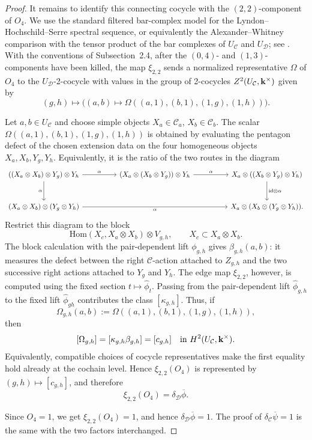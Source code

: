 \documentclass[12pt]{amsart}
\numberwithin{equation}{section}
\theoremstyle{definition}
\newcommand{\id}{\text{id}}
\newcommand{\Hom}{\text{Hom}}
\newcommand{\1}{_{(1)}}
\newcommand{\2}{_{(2)}}
\newcommand{\3}{_{(3)}}
\newcommand{\4}{_{(4)}}
\newcommand{\5}{_{(5)}}
\newcommand{\6}{_{(6)}}
\newcommand{\C}{\mathcal{C}}
\theoremstyle{plain}
\theoremstyle{definition}
\theoremstyle{remark}
\def\C{\mathcal{C}}
\def\D{\mathcal{D}}
\def\Hom{\mathrm{Hom}}
\begin{document}
\begin{proof}
It remains to identify this connecting cocycle with the
$(2,2)$-component of $O_4$. We use the standard filtered bar-complex
model for the Lyndon--Hochschild--Serre spectral sequence, or
equivalently the Alexander--Whitney comparison with the tensor product
of the bar complexes of $U_\C$ and $U_\D$; see
\cite[Chapter VII, Sections 6--7]{Brown}. With the conventions of
Subsection~2.4, after the $(0,4)$- and $(1,3)$-components have been
killed, the map $\xi_{2,2}$ sends a normalized representative $\Omega$
of $O_4$ to the $U_\D$-2-cocycle with values in the group of 2-cocycles $Z^2(U_\C,\bold k^\times)$
given by
\[
        (g,h)\longmapsto
        \big((a,b)\longmapsto
        \Omega((a,1),(b,1),(1,g),(1,h))\big).
\]

Let $a,b\in U_\C$ and choose simple objects
$X_a\in \C_a$, $X_b\in \C_b$. The scalar
$
        \Omega((a,1),(b,1),(1,g),(1,h))
$
is obtained by evaluating the pentagon defect of the chosen extension
data on the four homogeneous objects
$
        X_a, X_b, Y_g, Y_h.
$
Equivalently, it is the ratio of the two routes in the diagram \scriptsize
\[
\begin{tikzcd}[column sep=huge,row sep=large]
((X_a\otimes X_b)\otimes Y_g)\otimes Y_h
\arrow[r,"\alpha"]
\arrow[d,"\alpha"']
&
(X_a\otimes (X_b\otimes Y_g))\otimes Y_h
\arrow[r,"\alpha"]
&
X_a\otimes ((X_b\otimes Y_g)\otimes Y_h)
\arrow[d,"\id\otimes \alpha"]
\\
(X_a\otimes X_b)\otimes (Y_g\otimes Y_h)
\arrow[rr,"\alpha"']
&&
X_a\otimes (X_b\otimes (Y_g\otimes Y_h)).
\end{tikzcd}
\] \normalsize
Restrict this diagram to the block
\[
        \Hom(X_c,X_a\otimes X_b)\otimes V_{g,h},
        \qquad X_c\subset X_a\otimes X_b.
\]
The block calculation with the pair-dependent lift $\phi_{g,h}$ gives
$\beta_{g,h}(a,b)$: it measures the defect between the right
$\C$-action attached to $Z_{g,h}$ and the two successive right actions
attached to $Y_g$ and $Y_h$. The edge map $\xi_{2,2}$, however, is
computed using the fixed section $t\mapsto\widehat{\phi}_t$. Passing
from the pair-dependent lift $\widehat{\phi}_{g,h}$ to the fixed lift
$\widehat{\phi}_{gh}$ contributes the class
$[\kappa_{g,h}]$. Thus, if
\[
        \Omega_{g,h}(a,b):=
        \Omega((a,1),(b,1),(1,g),(1,h)),
\]
then
\[
        [\Omega_{g,h}]
        =[\kappa_{g,h}\beta_{g,h}]
        =[c_{g,h}]
        \quad\text{in }H^2(U_\C,\bold k^\times).
\]
Equivalently, compatible choices of cocycle representatives make the
first equality hold already at the cochain level. Hence
$\xi_{2,2}(O_4)$ is represented by
$(g,h)\mapsto[c_{g,h}]$, and therefore
\[
        \xi_{2,2}(O_4)=\delta_\D\overline\phi.
\]

Since $O_4=1$, we get $\xi_{2,2}(O_4)=1$, and hence
$\delta_\D\overline\phi=1$. The proof of
$\delta_\C\overline\psi=1$ is the same with the two factors interchanged.
\end{proof}
\end{document}
